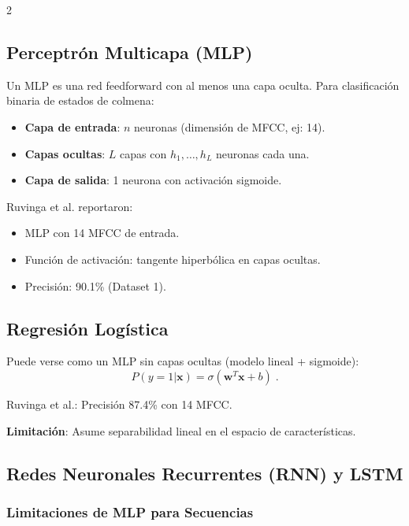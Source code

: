 \documentclass[12pt]{report}
\newenvironment{tightmulticols}{%
  \begin{multicols}{2}
  \setlength{\parskip}{1.2pt}
  \linespread{1}\selectfont
}{%
  \end{multicols}
}
\begin{document}
\begin{tightmulticols}
\subsection{Perceptrón Multicapa (MLP)}

\noindent Un MLP es una red feedforward con al menos una capa oculta. Para clasificación binaria de estados de colmena:

\begin{itemize}
    \item \textbf{Capa de entrada}: $n$ neuronas (dimensión de MFCC, ej: 14).
    \item \textbf{Capas ocultas}: $L$ capas con $h_1, \ldots, h_L$ neuronas cada una.
    \item \textbf{Capa de salida}: 1 neurona con activación sigmoide.
\end{itemize}

\noindent Ruvinga et al. \cite{ruvinga2023} reportaron:
\begin{itemize}
    \item MLP con 14 MFCC de entrada.
    \item Función de activación: tangente hiperbólica en capas ocultas.
    \item Precisión: 90.1\% (Dataset 1).
\end{itemize}

\subsection{Regresión Logística}

\noindent Puede verse como un MLP sin capas ocultas (modelo lineal + sigmoide):
\begin{equation*}
    P(y=1|\mathbf{x}) = \sigma(\mathbf{w}^T\mathbf{x} + b) \; .
\end{equation*}

\noindent Ruvinga et al.: Precisión 87.4\% con 14 MFCC.

\noindent\par \textbf{Limitación}: Asume separabilidad lineal en el espacio de características.

\subsection{Redes Neuronales Recurrentes (RNN) y LSTM}

\subsubsection{Limitaciones de MLP para Secuencias}


\end{tightmulticols}
\end{document}
